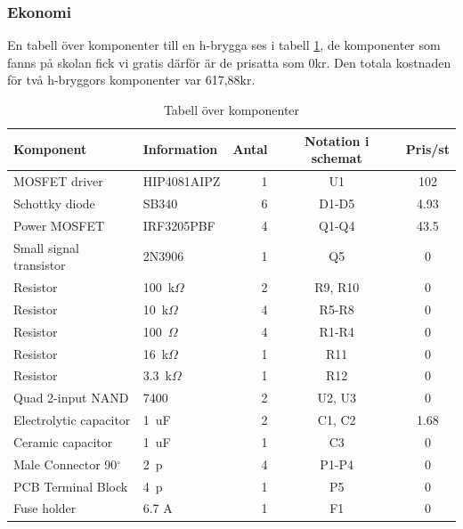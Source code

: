 \subsubsection{Ekonomi}
En tabell över komponenter till en h-brygga ses i tabell \ref{tbl:BOM}, de komponenter som fanns på skolan fick vi gratis därför är de prisatta som 0kr. Den totala kostnaden för två h-bryggors komponenter var 617,88kr. 

\begin{table}[htb]
\centering
\caption{Tabell över komponenter}
\label{tbl:BOM}
\begin{tabular}{|l|l|r|c|c|}
\hline
\textbf{Komponent} & \textbf{Information} & \textbf{Antal} &
\textbf{Notation i schemat} & \textbf{Pris/st} \\
\hline
MOSFET driver & HIP4081AIPZ & 1 & U1 & 102 \\
\hline
Schottky diode & SB340 & 6 & D1-D5 & 4.93\\
\hline
Power MOSFET & IRF3205PBF & 4 & Q1-Q4 & 43.5\\
\hline
Small signal transistor & 2N3906 & 1 & Q5 & 0\\
\hline
Resistor & 100~k$\Omega$ & 2 & R9, R10 & 0\\
\hline
Resistor & 10~k$\Omega$ & 4 & R5-R8 & 0\\
\hline
Resistor & 100~$\Omega$ & 4 & R1-R4 & 0\\
\hline
Resistor & 16~k$\Omega$ & 1 & R11 & 0\\
\hline
Resistor & 3.3~k$\Omega$ & 1 & R12 & 0\\
\hline
Quad 2-input NAND & 7400 & 2 & U2, U3 & 0\\
\hline
Electrolytic capacitor & 1~uF & 2 & C1, C2 & 1.68\\
\hline
Ceramic capacitor & 1~uF & 1 & C3 & 0\\
\hline
Male Connector 90$^{\circ}$ & 2~p & 4 & P1-P4 & 0\\
\hline
PCB Terminal Block &  4~p & 1 & P5 & 0\\
\hline
Fuse holder & 6.7 A & 1 & F1 & 0\\
\hline
\end{tabular}	
\end{table}